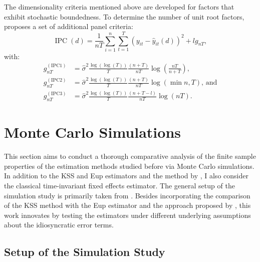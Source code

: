 The dimensionality criteria mentioned above are developed for factors that exhibit stochastic boundedness. To determine the number of unit root factors, \citet{bai2004estimating} proposes a set of additional panel criteria:
\begin{equation}
    \operatorname{IPC}(d)=\frac{1}{n T} \sum_{i=1}^n \sum_{t=1}^T\left(y_{i t}-\hat{y}_{i t}(d)\right)^2+l g_{n T},
\end{equation}
with:
\begin{align}
g_{n T}^{(\mathrm{IPC} 1)} & =\hat{\sigma}^2 \frac{\log (\log (T))}{T} \frac{(n+T)}{n T} \log \left(\frac{n T}{n+T}\right), \\
g_{n T}^{(\mathrm{IPC} 2)} & =\hat{\sigma}^2 \frac{\log (\log (T))}{T} \frac{(n+T)}{n T} \log (\min {n, T}), \, \text{and} \\
g_{n T}^{(\mathrm{IPC} 3)} & =\hat{\sigma}^2 \frac{\log (\log (T))}{T} \frac{(n+T-l)}{n T} \log (n T).
\end{align}

\section{Monte Carlo Simulations}\label{simulation}


This section aims to conduct a thorough comparative analysis of the finite sample properties of the estimation methods studied before via Monte Carlo simulations. In addition to the \ac{KSS} and \ac{Eup} estimators and the method by \citet{bai2009panel}, I also consider the classical time-invariant fixed effects estimator. The general setup of the simulation study is primarily taken from \citet{kneip2012new}. Besides incorporating the comparison of the \ac{KSS} method with the \ac{Eup} estimator and the approach proposed by \citet{bai2009panel}, this work innovates by testing the estimators under different underlying assumptions about the idiosyncratic error terms. 

\subsection{Setup of the Simulation Study}

